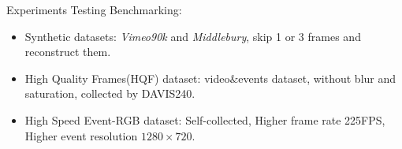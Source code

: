 \documentclass[aspectratio=43]{beamer}
\begin{document}
	\begin{frame}{Experiments}
		Testing Benchmarking:
		\begin{itemize}
			\item Synthetic datasets: \textit{Vimeo90k} and \textit{Middlebury}, skip 1 or 3 frames and reconstruct them.
			\item High Quality Frames(HQF) dataset: \alert{video$ \& $events} dataset, without blur and saturation, collected by DAVIS240.
			\item<2> High Speed Event-RGB dataset: \alert{Self-collected}, \alert{Higher frame rate 225FPS}, \alert{Higher event resolution $ 1280 \times 720 $}.
		\end{itemize}
	\end{frame}
	
\end{document}
